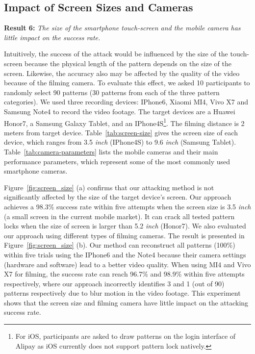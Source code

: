     \subsection{Impact of Screen Sizes and Cameras}
    \label{section: screen-size and cameras}
    \noindent \textbf{Result 6:} \emph{The size of the smartphone touch-screen and the mobile camera has little impact on the success rate.}

    Intuitively, the success of the attack would be influenced by the size of
    the touch-screen because the physical length of the pattern depends on
    the size of the screen. Likewise, the accuracy also may be affected by
    the quality of the video because of the filming camera. To evaluate this
    effect, we asked 10 participants to randomly select 90 patterns (30
    patterns from each of the three pattern categories). We used three
    recording devices: IPhone6, Xiaomi MI4, Vivo X7 and Samsung Note4 to
    record the video footage. The target devices are a Huawei Honor7, a
    Samsung Galaxy Tablet, and an IPhone4S\footnote{For iOS, participants are asked
    to draw  patterns on the login interface of Alipay as iOS
    currently does not support pattern lock natively.}. The filming distance is 2
    meters from target device. Table~\ref{tab:screen-size} gives the screen
    size of each device, which ranges from 3.5 \emph{inch} (IPhone4S) to
    9.6 \emph{inch} (Samsung Tablet). Table~\ref{tab:camera-parameters} lists
    the mobile cameras and their main performance parameters, which
    represent some of the most commonly used smartphone cameras.

    Figure~\ref{fig:screen_size} (a) confirms that our attacking method
    is not significantly affected by the size of the
     target device's screen. Our approach achieves a 98.3\%  success rate within five
    attempts when the screen size is 3.5 \emph{inch} (a small screen in the current
     mobile market). It can crack all tested pattern locks when
    the size of screen is larger than 5.2 \emph{inch} (Honor7). We also
    evaluated  our approach using different types of filming cameras.
    The result is presented in Figure~\ref{fig:screen_size}
    (b). Our method can reconstruct all patterns (100\%) within five trials using
    the IPhone6 and the Note4 because their camera settings (hardware and software) lead to a better video
    quality.   When using MI4 and Vivo X7 for filming,
     the success rate can reach 96.7\% and 98.9\% within five
    attempts respectively, where our approach incorrectly identifies 3 and 1 (out of
    90) patterns respectively due to blur motion in the video footage.
    This experiment shows that the screen size and filming camera
    have little impact on the attacking success rate.


